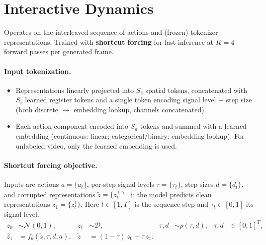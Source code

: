 \documentclass[11pt]{article}
\begin{document}
\section{Interactive Dynamics}

Operates on the interleaved sequence of actions and (frozen) tokenizer representations.
Trained with \textbf{shortcut forcing} for fast inference at $K=4$ forward passes per
generated frame.

\paragraph{Input tokenization.}
\begin{itemize}
  \item Representations linearly projected into $S_z$ spatial tokens, concatenated with
    $S_r$ learned register tokens and a single token encoding signal level + step size
    (both discrete $\to$ embedding lookup, channels concatenated).
  \item Each action component encoded into $S_a$ tokens and summed with a learned
    embedding (continuous: linear; categorical/binary: embedding lookup). For unlabeled
    video, only the learned embedding is used.
\end{itemize}

\paragraph{Shortcut forcing objective.}
Inputs are actions $a=\{a_t\}$, per-step signal levels $\tau=\{\tau_t\}$, step sizes
$d=\{d_t\}$, and corrupted representations $\tilde z = \{z_t^{(\tau_t)}\}$; the model
predicts clean representations $z_1 = \{z_t^1\}$. Here $t\in[1,T]$ is the sequence step
and $\tau_t\in[0,1]$ its signal level.
\begin{align}
  z_0 &\sim \mathcal{N}(0,1), & z_1 &\sim \mathcal{D}, & \tau,d &\sim p(\tau,d),
  & \tau,d &\in [0,1]^T, \\
  \hat z_1 &= f_\theta(\tilde z,\tau,d,a), & \tilde z &= (1-\tau)\,z_0 + \tau\,z_1.
\end{align}
\end{document}
